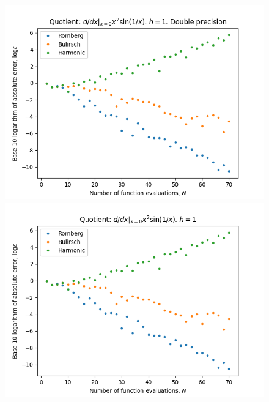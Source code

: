 \begin{figure}[H]
\centering
\begin{minipage}{0.45\textwidth}
\centering
\includegraphics[scale=0.45]{../results/diff_quot_plots/xsin.png}
\end{minipage}
\begin{minipage}{0.45\textwidth}
\centering
\includegraphics[scale=0.45]{../results/diff_quot_plots/xsin_hp.png}
\end{minipage}
\end{figure}

